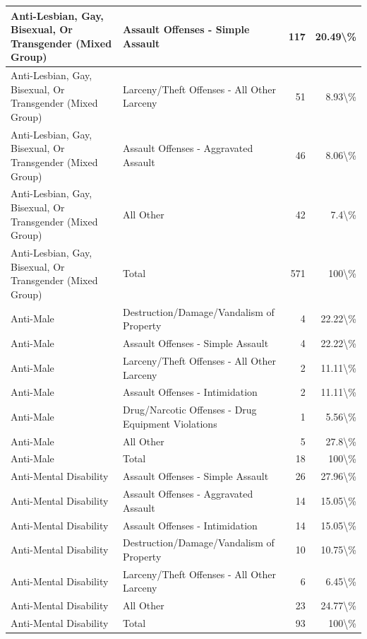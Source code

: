 \documentclass[
]{krantz}
\begin{document}
\begin{longtable}[t]{l|l|r|r}
\hline
Anti-Lesbian, Gay, Bisexual, Or Transgender (Mixed Group) & Assault Offenses - Simple Assault & 117 & 20.49\textbackslash{}\%\\
\hline
Anti-Lesbian, Gay, Bisexual, Or Transgender (Mixed Group) & Larceny/Theft Offenses - All Other Larceny & 51 & 8.93\textbackslash{}\%\\
\hline
Anti-Lesbian, Gay, Bisexual, Or Transgender (Mixed Group) & Assault Offenses - Aggravated Assault & 46 & 8.06\textbackslash{}\%\\
\hline
Anti-Lesbian, Gay, Bisexual, Or Transgender (Mixed Group) & All Other & 42 & 7.4\textbackslash{}\%\\
\hline
Anti-Lesbian, Gay, Bisexual, Or Transgender (Mixed Group) & Total & 571 & 100\textbackslash{}\%\\
\hline
Anti-Male & Destruction/Damage/Vandalism of Property & 4 & 22.22\textbackslash{}\%\\
\hline
Anti-Male & Assault Offenses - Simple Assault & 4 & 22.22\textbackslash{}\%\\
\hline
Anti-Male & Larceny/Theft Offenses - All Other Larceny & 2 & 11.11\textbackslash{}\%\\
\hline
Anti-Male & Assault Offenses - Intimidation & 2 & 11.11\textbackslash{}\%\\
\hline
Anti-Male & Drug/Narcotic Offenses - Drug Equipment Violations & 1 & 5.56\textbackslash{}\%\\
\hline
Anti-Male & All Other & 5 & 27.8\textbackslash{}\%\\
\hline
Anti-Male & Total & 18 & 100\textbackslash{}\%\\
\hline
Anti-Mental Disability & Assault Offenses - Simple Assault & 26 & 27.96\textbackslash{}\%\\
\hline
Anti-Mental Disability & Assault Offenses - Aggravated Assault & 14 & 15.05\textbackslash{}\%\\
\hline
Anti-Mental Disability & Assault Offenses - Intimidation & 14 & 15.05\textbackslash{}\%\\
\hline
Anti-Mental Disability & Destruction/Damage/Vandalism of Property & 10 & 10.75\textbackslash{}\%\\
\hline
Anti-Mental Disability & Larceny/Theft Offenses - All Other Larceny & 6 & 6.45\textbackslash{}\%\\
\hline
Anti-Mental Disability & All Other & 23 & 24.77\textbackslash{}\%\\
\hline
Anti-Mental Disability & Total & 93 & 100\textbackslash{}\%\\

\end{longtable}
\end{document}
